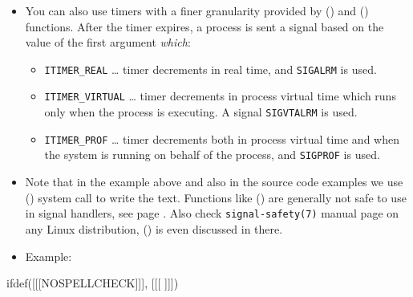 \begin{itemize}
\item You can also use timers with a finer granularity provided by
() and () functions.  After the timer expires,
a process is sent a signal based on the value of the first argument
\emph{which}:
\begin{itemize}
\item \texttt{ITIMER\_REAL} \dots{} timer decrements in real time, and
\texttt{SIGALRM} is used.
\item \texttt{ITIMER\_VIRTUAL} \dots{} timer decrements in process virtual time
which runs only when the process is executing.  A signal \texttt{SIGVTALRM} is
used.
\item \texttt{ITIMER\_PROF} \dots{} timer decrements both in process virtual
time and when the system is running on behalf of the process, and
\texttt{SIGPROF} is used.
\end{itemize}
\item Note that in the example above and also in the source code examples we use
() system call to write the text.  Functions like ()
are generally not safe to use in signal handlers, see page
\pageref{ASYNCSIGNALSAFE}.  Also check \texttt{signal-safety(7)} manual page on
any Linux distribution, () is even discussed in there.
\item Example: 
\end{itemize}


ifdef([[[NOSPELLCHECK]]], [[[
]]])



